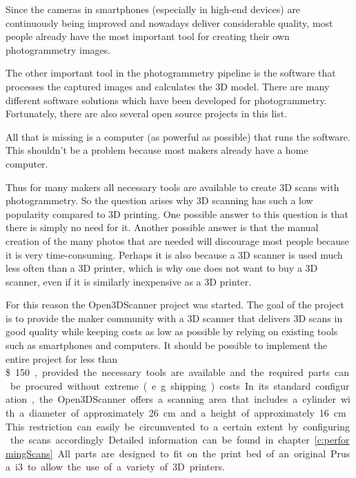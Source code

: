 Since the cameras in smartphones (especially in high-end devices) are continuously being improved and nowadays deliver considerable quality, most people already have the most important tool for creating their own photogrammetry images.%

The other important tool in the photogrammetry pipeline is the software that processes the captured images and calculates the 3D model. There are many different software solutions which have been developed for photogrammetry. Fortunately, there are also several open source projects in this list.%

All that is missing is a computer (as powerful as possible) that runs the software. This shouldn't be a problem because most makers already have a home computer.%

Thus for many makers all necessary tools are available to create 3D scans with photogrammetry. So the question arises why 3D scanning has such a low popularity compared to 3D printing. One possible answer to this question is that there is simply no need for it. Another possible answer is that the manual creation of the many photos that are needed will discourage most people because it is very time-consuming. Perhaps it is also because a 3D scanner is used much less often than a 3D printer, which is why one does not want to buy a 3D scanner, even if it is similarly inexpensive as a 3D printer.%

For this reason the Open3DScanner project was started. The goal of the project is to provide the maker community with a 3D scanner that delivers 3D scans in good quality while keeping costs as low as possible by relying on existing tools such as smartphones and computers. It should be possible to implement the entire project for less than \SI[round-precision=2,round-mode=places,round-integer-to-decimal]{150}[\$], provided the necessary tools are available and the required parts can be procured without extreme (e.g. shipping) costs.%

In its standard configuration, the Open3DScanner offers a scanning area that includes a cylinder with a diameter of approximately \SI{26}{\centi\meter} and a height of approximately \SI{16}{\centi\meter}. This restriction can easily be circumvented to a certain extent by configuring the scans accordingly. Detailed information can be found in chapter~\ref{c:performingScans}. All parts are designed to fit on the print bed of an original Prusa i3 to allow the use of a variety of 3D printers.%

